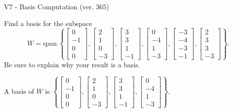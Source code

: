\begin{exercise}
  \begin{exerciseTitle}V7 - Basis Computation (ver. 365)\end{exerciseTitle}
  \begin{exerciseStatement}
    Find a basis for the subspace 
\[W=\mathrm{span}\ \left\{\left[\begin{array}{r}
0 \\
-1 \\
0 \\
0
\end{array}\right] , \left[\begin{array}{r}
2 \\
1 \\
0 \\
-3
\end{array}\right] , \left[\begin{array}{r}
3 \\
3 \\
1 \\
-1
\end{array}\right] , \left[\begin{array}{r}
0 \\
-4 \\
1 \\
-3
\end{array}\right] , \left[\begin{array}{r}
-3 \\
-4 \\
-3 \\
-1
\end{array}\right] , \left[\begin{array}{r}
2 \\
3 \\
3 \\
-3
\end{array}\right]\right\}.\]
 Be sure to explain why your result is a basis.


  \end{exerciseStatement}
  \begin{exerciseAnswer}
   A basis of \(W\) is  \(\left\{\left[\begin{array}{r}
0 \\
-1 \\
0 \\
0
\end{array}\right] , \left[\begin{array}{r}
2 \\
1 \\
0 \\
-3
\end{array}\right] , \left[\begin{array}{r}
3 \\
3 \\
1 \\
-1
\end{array}\right] , \left[\begin{array}{r}
0 \\
-4 \\
1 \\
-3
\end{array}\right]\right\}\).
  


  \end{exerciseAnswer}
\end{exercise}